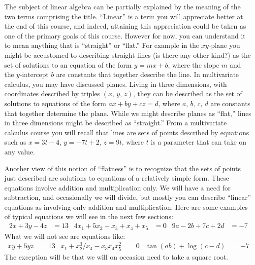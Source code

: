 %
%
The subject of linear algebra can be partially explained by the meaning of the two terms comprising the title.  ``Linear'' is a term you will appreciate better at the end of this course, and indeed, attaining this appreciation could be taken as one of the primary goals of this course.  However for now, you can understand it to mean anything that is ``straight'' or ``flat.''  For example in the $xy$-plane you might be accustomed to describing straight lines (is there any other kind?) as the set of solutions to an equation of the form $y = mx + b$, where the slope $m$ and the $y$-intercept $b$ are constants that together describe the line.  In multivariate calculus, you may have discussed planes.  Living in three dimensions, with coordinates described by triples $(x,\,y,\,z)$, they can be described as the set of solutions to equations of the form $ax+by+cz=d$, where $a,\,b,\,c,\,d$ are constants that together determine the plane.  While we might describe planes as ``flat,'' lines in three dimensions might be described as ``straight.''   From a multivariate calculus course you will recall that lines are sets of points described by equations such as $x=3t-4$, $y=-7t+2$, $z=9t$, where $t$ is a parameter that can take on any value.\par
%
Another view of this notion of ``flatness'' is to recognize that the sets of points just described are solutions to equations of a relatively simple form.  These equations involve addition and multiplication only.  We will have a need for subtraction, and occasionally we will divide, but mostly you can describe ``linear'' equations as involving only addition and multiplication.  Here are some examples of typical equations we will see in the next few sections:
%
\begin{align*}
2x+3y-4z&=13
&
4x_1+5x_2-x_3+x_4+x_5&=0
&
9a-2b+7c+2d&=-7
\end{align*}
%
What we will not see are equations like:
%
\begin{align*}
xy + 5yz&=13
&
x_1 + x_2^3/x_4 - x_3x_4x_5^2&=0
&
\tan(ab)+\log(c-d)&=-7
\end{align*}
%
The exception will be that we will on occasion need to take a square root.\par
